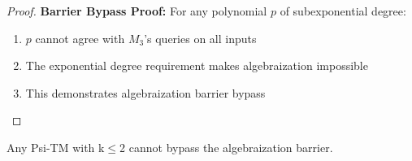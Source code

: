 \documentclass[11pt]{article}
\begin{document}
\begin{proof}
\textbf{Barrier Bypass Proof:}
For any polynomial $p$ of subexponential degree:
\begin{enumerate}
\item $p$ cannot agree with $M_3$'s queries on all inputs
\item The exponential degree requirement makes algebraization impossible
\item This demonstrates algebraization barrier bypass
\end{enumerate}
\end{proof}

\begin{theorem}
\label{thm:algebraization-k2}
Any Psi-TM with k$\leq$2 cannot bypass the algebraization barrier.
\end{theorem}
\end{document}
